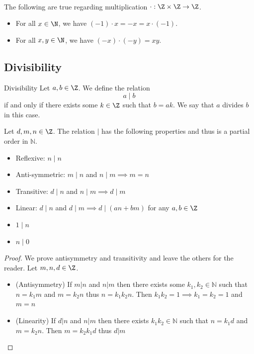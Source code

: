 \documentclass[a4paper]{article}
\begin{document}
\begin{lmm}{}{}\\
The following are true regarding multiplication $\cdot:\Z\times\Z\to\Z$. 
\begin{itemize}
\item For all $x\in\N$, we have $(-1)\cdot x=-x=x\cdot(-1)$. 
\item For all $x,y\in\N$, we have $(-x)\cdot(-y)=xy$. 
\end{itemize}
\end{lmm}

\subsection{Divisibility}
\begin{defn}{Divisibility}{} Let $a,b\in\Z$. We define the relation $$a\;|\;b$$ if and only if there exists some $k\in\Z$ such that $b=ak$. We say that $a$ divides $b$ in this case. 
\end{defn}

\begin{prp}{}{} Let $d,m,n\in\Z$. The relation $|$ has the following properties and thus is a partial order in $\mathbb{N}$. 
\begin{itemize}
\item Reflexive: $n\;|\;n$
\item Anti-symmetric: $m\;|\;n$ and $n\;|\;m\implies m=n$
\item Transitive: $d\;|\;n$ and $n\;|\;m\implies d\;|\;m$
\item Linear: $d\;|\;n$ and $d\;|\;m\implies d\;|\;(an+bm)$ for any $a,b\in\Z$
\item $1\;|\;n$
\item $n\;|\;0$
\end{itemize} 
\begin{proof} We prove antisymmetry and transitivity and leave the others for the reader. Let $m,n,d\in\Z$. 
\begin{itemize}
\item (Antisymmetry) If $m|n$ and $n|m$ then there exists some $k_1,k_2\in\mathbb{N}$ such that $n=k_1m$ and $m=k_2n$ thus $n=k_1k_2n$. Then $k_1k_2=1\implies k_1=k_2=1$ and $m=n$
\item (Linearity) If $d|n$ and $n|m$ then there exists $k_1k_2\in\mathbb{N}$ such that $n=k_1d$ and $m=k_2n$. Then $m=k_2k_1d$ thus $d|m$
\end{itemize}
\end{proof}
\end{prp}
\end{document}

